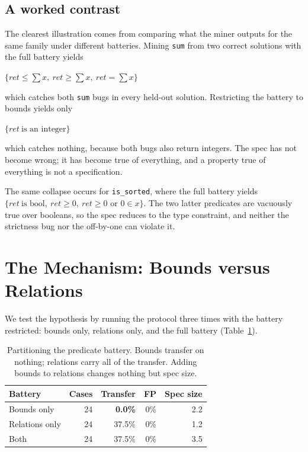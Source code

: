 \documentclass[conference]{IEEEtran}
\begin{document}
\subsection{A worked contrast}

The clearest illustration comes from comparing what the miner outputs for the same family
under different batteries. Mining \texttt{sum} from two correct solutions with the full
battery yields

\begin{center}
$\{\mathit{ret} \le \sum x,\ \mathit{ret} \ge \sum x,\ \mathit{ret} = \sum x\}$
\end{center}

which catches both \texttt{sum} bugs in every held-out solution. Restricting the battery to
bounds yields only

\begin{center}
$\{\mathit{ret}\ \text{is an integer}\}$
\end{center}

which catches nothing, because both bugs also return integers. The spec has not become
wrong; it has become true of everything, and a property true of everything is not a
specification.

The same collapse occurs for \texttt{is\_sorted}, where the full battery yields
$\{\mathit{ret}\ \text{is bool},\ \mathit{ret} \ge 0,\ \mathit{ret} \ge 0 \text{ or } 0 \in x\}$.
The two latter predicates are vacuously true over booleans, so the spec reduces to the type
constraint, and neither the strictness bug nor the off-by-one can violate it.

\section{The Mechanism: Bounds versus Relations}

We test the hypothesis by running the protocol three times with the battery restricted:
bounds only, relations only, and the full battery (Table~\ref{tab:split}).

\begin{table}[t]
\centering
\caption{Partitioning the predicate battery. Bounds transfer on nothing; relations carry
all of the transfer. Adding bounds to relations changes nothing but spec size.}
\label{tab:split}
\small
\begin{tabular}{@{}lrrrr@{}}
\toprule
Battery & Cases & Transfer & FP & Spec size \\
\midrule
Bounds only & 24 & \textbf{0.0\%} & 0\% & 2.2 \\
Relations only & 24 & 37.5\% & 0\% & 1.2 \\
Both & 24 & 37.5\% & 0\% & 3.5 \\
\bottomrule
\end{tabular}
\end{table}
\end{document}

